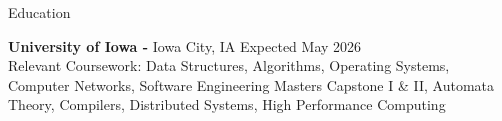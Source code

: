 \documentclass{resume} %
\begin{document}
%



\begin{rSection}{Education}

{\bf University of Iowa -} Iowa City, IA  \hfill {Expected May 2026}\\ 
Relevant Coursework: Data Structures, Algorithms, Operating Systems, Computer Networks, Software Engineering Masters Capstone I \& II, Automata Theory, Compilers, Distributed Systems, High Performance Computing



\end{rSection}

\end{document}
